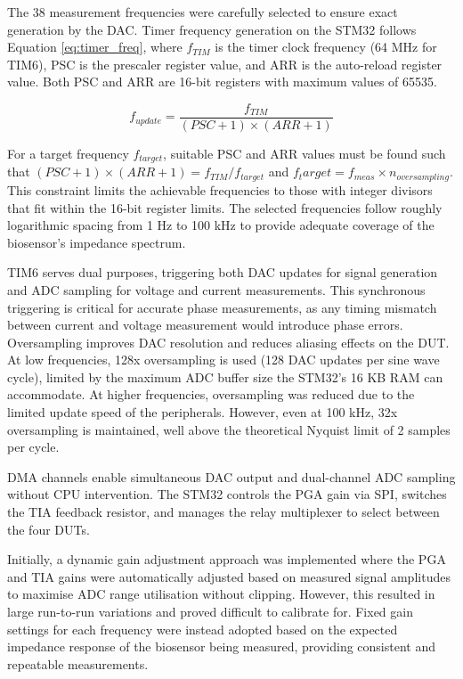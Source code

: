 The 38 measurement frequencies were carefully selected to ensure exact generation by the \ac{DAC}. Timer frequency generation on the STM32 follows Equation \ref{eq:timer_freq}, where $f_{TIM}$ is the timer clock frequency (64 MHz for TIM6), PSC is the prescaler register value, and ARR is the auto-reload register value. Both PSC and ARR are 16-bit registers with maximum values of 65535.

\begin{equation}
    f_{update} = \frac{f_{TIM}}{(PSC + 1) \times (ARR + 1)}
    \label{eq:timer_freq}
\end{equation}

For a target frequency $f_{target}$, suitable PSC and ARR values must be found such that $(PSC + 1) \times (ARR + 1) = f_{TIM} / f_{target}$ and $f_target = f_{meas} \times n_{oversampling}$. This constraint limits the achievable frequencies to those with integer divisors that fit within the 16-bit register limits. The selected frequencies follow roughly logarithmic spacing from 1 Hz to 100 kHz to provide adequate coverage of the biosensor's impedance spectrum.

TIM6 serves dual purposes, triggering both \ac{DAC} updates for signal generation and \ac{ADC} sampling for voltage and current measurements. This synchronous triggering is critical for accurate phase measurements, as any timing mismatch between current and voltage measurement would introduce phase errors. Oversampling improves \ac{DAC} resolution and reduces aliasing effects on the \ac{DUT}. At low frequencies, 128x oversampling is used (128 \ac{DAC} updates per sine wave cycle), limited by the maximum \ac{ADC} buffer size the STM32's 16 KB RAM can accommodate. At higher frequencies, oversampling was reduced due to the limited update speed of the peripherals. However, even at 100 kHz, 32x oversampling is maintained, well above the theoretical Nyquist limit of 2 samples per cycle.

\ac{DMA} channels enable simultaneous \ac{DAC} output and dual-channel \ac{ADC} sampling without CPU intervention. The STM32 controls the \ac{PGA} gain via SPI, switches the \ac{TIA} feedback resistor, and manages the relay multiplexer to select between the four \acp{DUT}.

Initially, a dynamic gain adjustment approach was implemented where the \ac{PGA} and \ac{TIA} gains were automatically adjusted based on measured signal amplitudes to maximise \ac{ADC} range utilisation without clipping. However, this resulted in large run-to-run variations and proved difficult to calibrate for. Fixed gain settings for each frequency were instead adopted based on the expected impedance response of the biosensor being measured, providing consistent and repeatable measurements.

